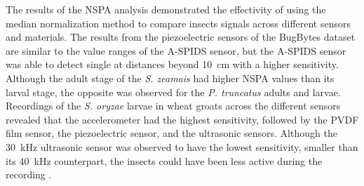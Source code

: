 The results of the NSPA analysis demonstrated the effectivity of using the median normalization method to compare insects signals across different sensors and materials. The results from the piezoelectric sensors of the BugBytes dataset are similar to the value ranges of the A-SPIDS sensor, but the A-SPIDS sensor was able to detect single at distances beyond \SI{10}{\centi\meter} with a higher sensitivity. Although the adult stage of the \textit{S. zeamais} had higher NSPA values than its larval stage, the opposite was observed for the \textit{P. truncatus} adults and larvae. Recordings of the \textit{S. oryzae} larvae in wheat groats across the different sensors revealed that the accelerometer had the highest sensitivity, followed by the PVDF film sensor, the piezoelectric sensor, and the ultrasonic sensors. Although the \SI{30}{\kilo\hertz} ultrasonic sensor was observed to have the lowest sensitivity, smaller than its \SI{40}{\kilo\hertz} counterpart, the insects could have been less active during the recording \cite{mankinAcousticIndicatorsTargeted2010}. 

\newpage